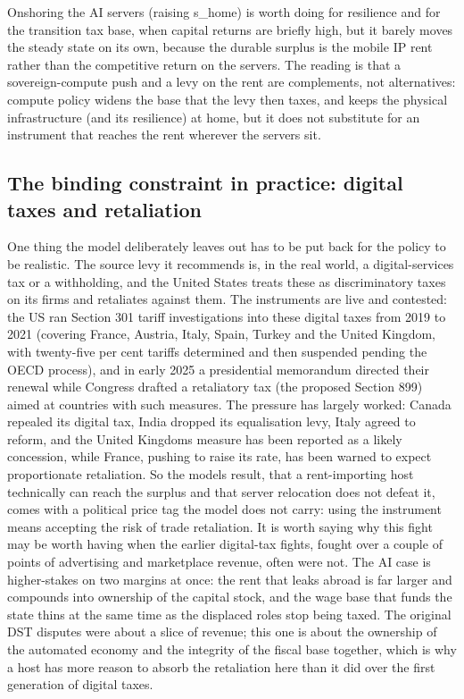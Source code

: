 \documentclass[11pt]{article}
\begin{document}
Onshoring the AI servers (raising s\_home) is worth doing for resilience
and for the transition tax base, when capital returns are briefly high,
but it barely moves the steady state on its own, because the durable
surplus is the mobile IP rent rather than the competitive return on the
servers. The reading is that a sovereign-compute push and a levy on the
rent are complements, not alternatives: compute policy widens the base
that the levy then taxes, and keeps the physical infrastructure (and its
resilience) at home, but it does not substitute for an instrument that
reaches the rent wherever the servers sit.

\hypertarget{the-binding-constraint-in-practice-digital-taxes-and-retaliation}{%
\subsection{The binding constraint in practice: digital taxes and
retaliation}\label{the-binding-constraint-in-practice-digital-taxes-and-retaliation}}

One thing the model deliberately leaves out has to be put back for the
policy to be realistic. The source levy it recommends is, in the real
world, a digital-services tax or a withholding, and the United States
treats these as discriminatory taxes on its firms and retaliates against
them. The instruments are live and contested: the US ran Section 301
tariff investigations into these digital taxes from 2019 to 2021
(covering France, Austria, Italy, Spain, Turkey and the United Kingdom,
with twenty-five per cent tariffs determined and then suspended pending
the OECD process), and in early 2025 a presidential memorandum directed
their renewal while Congress drafted a retaliatory tax (the proposed
Section 899) aimed at countries with such measures. The pressure has
largely worked: Canada repealed its digital tax, India dropped its
equalisation levy, Italy agreed to reform, and the United
Kingdom\textquotesingle s measure has been reported as a likely
concession, while France, pushing to raise its rate, has been warned to
expect proportionate retaliation. So the model\textquotesingle s result,
that a rent-importing host technically can reach the surplus and that
server relocation does not defeat it, comes with a political price tag
the model does not carry: using the instrument means accepting the risk
of trade retaliation. It is worth saying why this fight may be worth
having when the earlier digital-tax fights, fought over a couple of
points of advertising and marketplace revenue, often were not. The AI
case is higher-stakes on two margins at once: the rent that leaks abroad
is far larger and compounds into ownership of the capital stock, and the
wage base that funds the state thins at the same time as the displaced
roles stop being taxed. The original DST disputes were about a slice of
revenue; this one is about the ownership of the automated economy and
the integrity of the fiscal base together, which is why a host has more
reason to absorb the retaliation here than it did over the first
generation of digital taxes.
\end{document}
